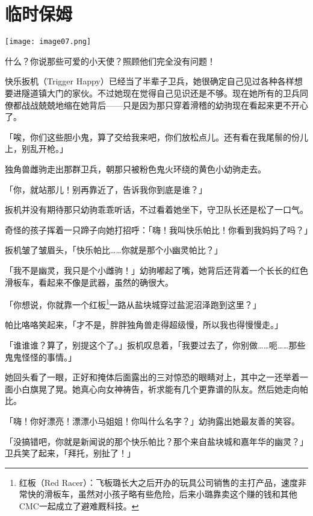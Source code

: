 \chapter{临时保姆}

\texttt{[image: image07.png]}


\begin{intro}
    什么？你说那些可爱的小天使？照顾他们完全没有问题！
\end{intro}


快乐扳机（Trigger Happy）已经当了半辈子卫兵，她很确定自己见过各种各样想要进隧道镇大门的家伙。不过她现在觉得自己见识还是不够。现在她所有的卫兵同僚都战战兢兢地缩在她背后——只是因为那只穿着滑稽的幼驹现在看起来更不开心了。

「唉，你们这些胆小鬼，算了交给我来吧，你们放松点儿。还有看在我尾鬃的份儿上，别乱开枪。」

独角兽雌驹走出那群卫兵，朝那只被粉色鬼火环绕的黄色小幼驹走去。

「你，就站那儿！别再靠近了，告诉我你到底是谁？」

扳机并没有期待那只幼驹乖乖听话，不过看着她坐下，守卫队长还是松了一口气。

奇怪的孩子挥着一只蹄子向她打招呼：「嗨！我叫快乐帕比！你看到我妈妈了吗？」

扳机皱了皱眉头，「快乐帕比……你就是那个小幽灵帕比？」

「我不是幽灵，我只是个小雌驹！」幼驹嘟起了嘴，她背后还背着一个长长的红色滑板车，看起来不像是武器，虽然的确很大。

「你想说，你就靠一个红板\footnote{红板（Red Racer）：飞板璐长大之后开办的玩具公司销售的主打产品，速度非常快的滑板车，虽然对小孩子略有些危险，后来小璐靠卖这个赚的钱和其他CMC一起成立了避难厩科技。}一路从盐块城穿过盐泥沼泽跑到这里？」

帕比咯咯笑起来，「才不是，胖胖独角兽走得超级慢，所以我也得慢慢走。」

「谁谁谁？算了，别提这个了。」扳机叹息着，「我要过去了，你别做……呃……那些鬼鬼怪怪的事情。」

她回头看了一眼，正好和掩体后面露出的三对惊恐的眼睛对上，其中之一还举着一面小白旗晃了晃。她真心向女神祷告，祈求能有几个更靠谱的队友。然后她走向帕比。

「嗨！你好漂亮！漂漂小马姐姐！你叫什么名字？」幼驹露出她最友善的笑容。

「没搞错吧，你就是新闻说的那个快乐帕比？那个来自盐块城和嘉年华的幽灵？」卫兵笑了起来，「拜托，别扯了！」


